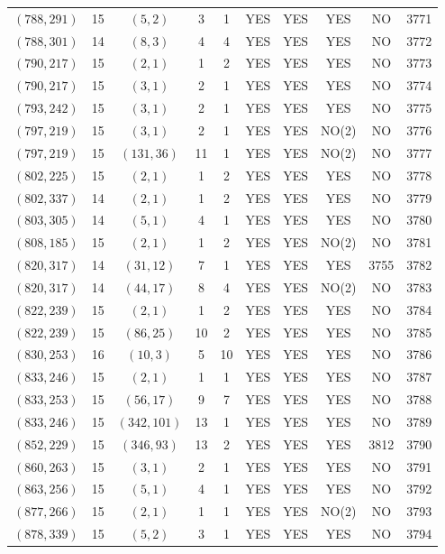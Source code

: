 \begin{longtable}{|c|c|c|c|c|c|c|c|c|c|}
$(788, 291)$ & 15 & $(5, 2)$ & 3 & 1 & YES & YES & YES & NO & 3771\\
$(788, 301)$ & 14 & $(8, 3)$ & 4 & 4 & YES & YES & YES & NO & 3772\\
$(790, 217)$ & 15 & $(2, 1)$ & 1 & 2 & YES & YES & YES & NO & 3773\\
$(790, 217)$ & 15 & $(3, 1)$ & 2 & 1 & YES & YES & YES & NO & 3774\\
$(793, 242)$ & 15 & $(3, 1)$ & 2 & 1 & YES & YES & YES & NO & 3775\\
$(797, 219)$ & 15 & $(3, 1)$ & 2 & 1 & YES & YES & NO(2) & NO & 3776\\
$(797, 219)$ & 15 & $(131, 36)$ & 11 & 1 & YES & YES & NO(2) & NO & 3777\\
$(802, 225)$ & 15 & $(2, 1)$ & 1 & 2 & YES & YES & YES & NO & 3778\\
$(802, 337)$ & 14 & $(2, 1)$ & 1 & 2 & YES & YES & YES & NO & 3779\\
$(803, 305)$ & 14 & $(5, 1)$ & 4 & 1 & YES & YES & YES & NO & 3780\\
$(808, 185)$ & 15 & $(2, 1)$ & 1 & 2 & YES & YES & NO(2) & NO & 3781\\
$(820, 317)$ & 14 & $(31, 12)$ & 7 & 1 & YES & YES & YES & 3755 & 3782\\
$(820, 317)$ & 14 & $(44, 17)$ & 8 & 4 & YES & YES & NO(2) & NO & 3783\\
$(822, 239)$ & 15 & $(2, 1)$ & 1 & 2 & YES & YES & YES & NO & 3784\\
$(822, 239)$ & 15 & $(86, 25)$ & 10 & 2 & YES & YES & YES & NO & 3785\\
$(830, 253)$ & 16 & $(10, 3)$ & 5 & 10 & YES & YES & YES & NO & 3786\\
$(833, 246)$ & 15 & $(2, 1)$ & 1 & 1 & YES & YES & YES & NO & 3787\\
$(833, 253)$ & 15 & $(56, 17)$ & 9 & 7 & YES & YES & YES & NO & 3788\\
$(833, 246)$ & 15 & $(342, 101)$ & 13 & 1 & YES & YES & YES & NO & 3789\\
$(852, 229)$ & 15 & $(346, 93)$ & 13 & 2 & YES & YES & YES & 3812 & 3790\\
$(860, 263)$ & 15 & $(3, 1)$ & 2 & 1 & YES & YES & YES & NO & 3791\\
$(863, 256)$ & 15 & $(5, 1)$ & 4 & 1 & YES & YES & YES & NO & 3792\\
$(877, 266)$ & 15 & $(2, 1)$ & 1 & 1 & YES & YES & NO(2) & NO & 3793\\
$(878, 339)$ & 15 & $(5, 2)$ & 3 & 1 & YES & YES & YES & NO & 3794\\

\end{longtable}

